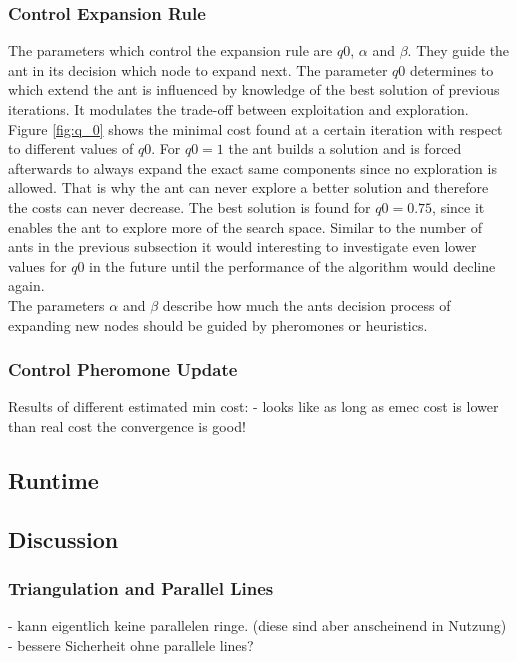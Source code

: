 \subsubsection{Control Expansion Rule}\label{expansion_rule}
The parameters which control the expansion rule are $q0$, $\alpha$ and $\beta$. They guide the ant in its decision which node to expand next. The parameter $q0$ determines to which extend the ant is influenced by knowledge of the best solution of previous iterations. It modulates the trade-off between exploitation and exploration. Figure \ref{fig:q_0} shows the minimal cost found at a certain iteration with respect to different values of $q0$. For $q0 = 1$ the ant builds a solution and is forced afterwards to always expand the exact same components since no exploration is allowed. That is why the ant can never explore a better solution and therefore the costs can never decrease. The best solution is found for $q0 = 0.75$, since it enables the ant to explore more of the search space. Similar to the number of ants in the previous subsection it would interesting to investigate even lower values for $q0$ in the future until the performance of the algorithm would decline again. \\

The parameters $\alpha$ and $\beta$ describe how much the ants decision process of expanding new nodes should be guided by pheromones or heuristics.


\subsubsection{Control Pheromone Update}\label{pheromone_update}

Results of different estimated min cost:
	- looks like as long as emec cost is lower than real cost the convergence is good!

\subsection{Runtime}
\subsection{Discussion}\label{sec:discussion}
\subsubsection{Triangulation and Parallel Lines}
	- kann eigentlich keine parallelen ringe. (diese sind aber anscheinend in Nutzung)
	- bessere Sicherheit ohne parallele lines?